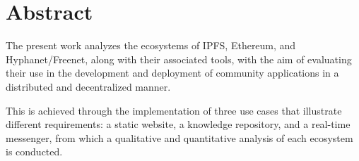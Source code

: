 \section{Abstract}

The present work analyzes the ecosystems of IPFS, Ethereum, and Hyphanet/Freenet, along with their associated tools, with the aim of evaluating their use in the development and deployment of community applications in a distributed and decentralized manner.

This is achieved through the implementation of three use cases that illustrate different requirements: a static website, a knowledge repository, and a real-time messenger, from which a qualitative and quantitative analysis of each ecosystem is conducted.